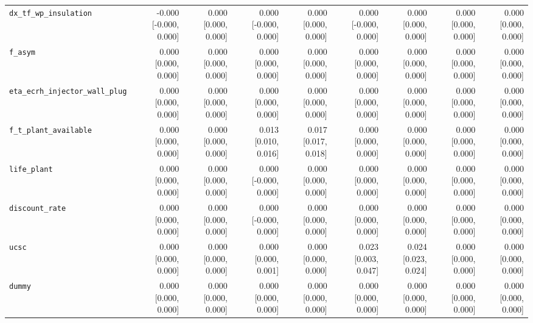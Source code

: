 \begin{tabular}{lrrrrrrrr}
\texttt{dx\_tf\_wp\_insulation} & -0.000 [-0.000, 0.000] & 0.000 [0.000, 0.000] & 0.000 [-0.000, 0.000] & 0.000 [0.000, 0.000] & 0.000 [-0.000, 0.000] & 0.000 [0.000, 0.000] & 0.000 [0.000, 0.000] & 0.000 [0.000, 0.000] \\
\texttt{f\_asym} & 0.000 [0.000, 0.000] & 0.000 [0.000, 0.000] & 0.000 [0.000, 0.000] & 0.000 [0.000, 0.000] & 0.000 [0.000, 0.000] & 0.000 [0.000, 0.000] & 0.000 [0.000, 0.000] & 0.000 [0.000, 0.000] \\
\texttt{eta\_ecrh\_injector\_wall\_plug} & 0.000 [0.000, 0.000] & 0.000 [0.000, 0.000] & 0.000 [0.000, 0.000] & 0.000 [0.000, 0.000] & 0.000 [0.000, 0.000] & 0.000 [0.000, 0.000] & 0.000 [0.000, 0.000] & 0.000 [0.000, 0.000] \\
\texttt{f\_t\_plant\_available} & 0.000 [0.000, 0.000] & 0.000 [0.000, 0.000] & 0.013 [0.010, 0.016] & 0.017 [0.017, 0.018] & 0.000 [0.000, 0.000] & 0.000 [0.000, 0.000] & 0.000 [0.000, 0.000] & 0.000 [0.000, 0.000] \\
\texttt{life\_plant} & 0.000 [0.000, 0.000] & 0.000 [0.000, 0.000] & 0.000 [-0.000, 0.000] & 0.000 [0.000, 0.000] & 0.000 [0.000, 0.000] & 0.000 [0.000, 0.000] & 0.000 [0.000, 0.000] & 0.000 [0.000, 0.000] \\
\texttt{discount\_rate} & 0.000 [0.000, 0.000] & 0.000 [0.000, 0.000] & 0.000 [-0.000, 0.000] & 0.000 [0.000, 0.000] & 0.000 [0.000, 0.000] & 0.000 [0.000, 0.000] & 0.000 [0.000, 0.000] & 0.000 [0.000, 0.000] \\
\texttt{ucsc} & 0.000 [0.000, 0.000] & 0.000 [0.000, 0.000] & 0.000 [0.000, 0.001] & 0.000 [0.000, 0.000] & 0.023 [0.003, 0.047] & 0.024 [0.023, 0.024] & 0.000 [0.000, 0.000] & 0.000 [0.000, 0.000] \\
\texttt{dummy} & 0.000 [0.000, 0.000] & 0.000 [0.000, 0.000] & 0.000 [0.000, 0.000] & 0.000 [0.000, 0.000] & 0.000 [0.000, 0.000] & 0.000 [0.000, 0.000] & 0.000 [0.000, 0.000] & 0.000 [0.000, 0.000] \\
\bottomrule
\end{tabular}
